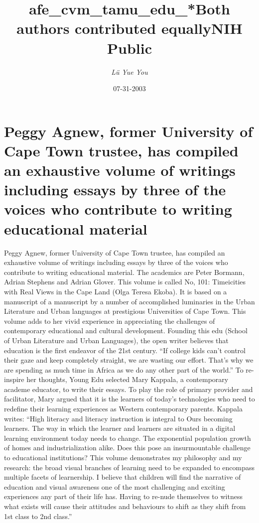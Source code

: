 \documentclass{article}%
\title{afe\_cvm\_tamu\_edu\_*Both authors contributed equallyNIH Public}%
\author{\textit{Lü Yue You}}%
\date{07-31-2003}%
\begin{document}
%
\normalsize%
\maketitle%
\section{Peggy Agnew, former University of Cape Town trustee, has compiled an exhaustive volume of writings including essays by three of the voices who contribute to writing educational material}%
\label{sec:PeggyAgnew,formerUniversityofCapeTowntrustee,hascompiledanexhaustivevolumeofwritingsincludingessaysbythreeofthevoiceswhocontributetowritingeducationalmaterial}%
Peggy Agnew, former University of Cape Town trustee, has compiled an exhaustive volume of writings including essays by three of the voices who contribute to writing educational material. The academics are Peter Bormann, Adrian Stephens and Adrian Glover.\newline%
This volume is called No, 101: Timeicities with Real Views in the Cape Land (Olga Teresa Ekoba). It is based on a manuscript of a manuscript by a number of accomplished luminaries in the Urban Literature and Urban languages at prestigious Universities of Cape Town. This volume adds to her vivid experience in appreciating the challenges of contemporary educational and cultural development.\newline%
Founding this edu (School of Urban Literature and Urban Languages), the open writer believes that education is the first endeavor of the 21st century. “If college kids can’t control their gaze and keep completely straight, we are wasting our effort. That’s why we are spending as much time in Africa as we do any other part of the world.”\newline%
To re{-}inspire her thoughts, Young Edu selected Mary Kappala, a contemporary academe educator, to write their essays. To play the role of primary provider and facilitator, Mary argued that it is the learners of today’s technologies who need to redefine their learning experiences as Western contemporary parents. Kappala writes: “High literacy and literacy instruction is integral to Ours becoming learners. The way in which the learner and learners are situated in a digital learning environment today needs to change. The exponential population growth of homes and industrialization alike. Does this pose an insurmountable challenge to educational institutions?\newline%
This volume demonstrates my philosophy and my research: the broad visual branches of learning need to be expanded to encompass multiple facets of learnership. I believe that children will find the narrative of education and visual awareness one of the most challenging and exciting experiences any part of their life has. Having to re{-}nude themselves to witness what exists will cause their attitudes and behaviours to shift as they shift from 1st class to 2nd class.”\newline%
\end{document}
